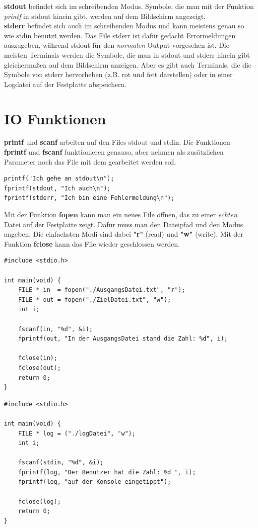 \documentclass[c_worksheet.tex]{subfiles}
\begin{document}
\textbf{stdout} befindet sich im schreibenden Modus. Symbole, die man mit der Funktion \textit{printf} in stdout hinein gibt, werden auf dem Bildschirm angezeigt.\\
\textbf{stderr} befindet sich auch im schreibenden Modus und kann meistens genau so wie stdin benutzt werden. Das File stderr ist dafür gedacht Errormeldungen auszugeben, während stdout für den \textit{normalen} Output vorgesehen ist. Die meisten Terminals werden die Symbole, die man in stdout und stderr hinein gibt gleichermaßen auf dem Bildschirm anzeigen. Aber es gibt auch Terminals, die die Symbole von stderr hervorheben (z.B. rot und fett darstellen) oder in einer Logdatei auf der Festplatte abspeichern.

\section{IO Funktionen}

\textbf{printf} und \textbf{scanf} arbeiten auf den Files stdout und stdin. Die Funktionen \textbf{fprintf} und \textbf{fscanf} funktionieren genauso, aber nehmen als zusätzlichen Parameter noch das File mit dem gearbeitet werden soll.

\begin{lstlisting}[numbers=none]
printf("Ich gehe an stdout\n");
fprintf(stdout, "Ich auch\n");
fprintf(stderr, "Ich bin eine Fehlermeldung\n");
\end{lstlisting}

Mit der Funktion \textbf{fopen} kann man ein neues File öffnen, das zu einer \textit{echten} Datei auf der Festplatte zeigt. Dafür muss man den Dateipfad und den Modus angeben. Die einfachsten Modi sind dabei \textbf{"r"} (read) und \textbf{"w"} (write). Mit der Funktion \textbf{fclose} kann das File wieder geschlossen werden.

\begin{lstlisting}
#include <stdio.h>

int main(void) {
    FILE * in  = fopen("./AusgangsDatei.txt", "r");
    FILE * out = fopen("./ZielDatei.txt", "w");
    int i;

    fscanf(in, "%d", &i);
    fprintf(out, "In der AusgangsDatei stand die Zahl: %d", i);

    fclose(in);
    fclose(out);
    return 0;
}
\end{lstlisting}

\begin{lstlisting}
#include <stdio.h>

int main(void) {
    FILE * log = ("./logDatei", "w");
    int i;
    
    fscanf(stdin, "%d", &i);
    fprintf(log, "Der Benutzer hat die Zahl: %d ", i);
    fprintf(log, "auf der Konsole eingetippt");

    fclose(log);
    return 0;
}
\end{lstlisting}
\end{document}
